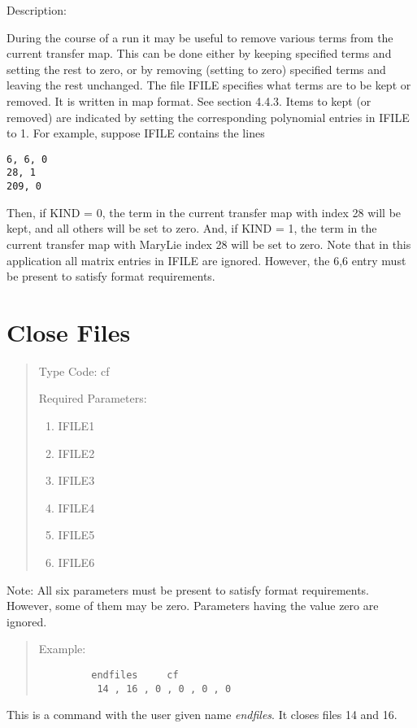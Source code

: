 \vspace{5mm}
     Description:
\vspace{2mm}

During the course of a \Mary run it may be useful to remove various terms from the current transfer map.  This can be done either by keeping specified terms and setting the rest to zero, or by removing (setting to zero) specified terms and leaving the rest unchanged.  The file IFILE specifies what terms are to be kept or removed.  It is written in map format.  See section 4.4.3.  Items to kept (or removed) are indicated by setting the corresponding polynomial entries in IFILE to 1.  For example,  suppose IFILE contains the lines
\begin{verbatim}
6, 6, 0
28, 1
209, 0
\end{verbatim}
Then, if KIND = 0, the term in the current transfer map with \Mary
index 28 will be kept, and all others will be set to zero.  And, if
KIND = 1, the term in the current transfer map with MaryLie index 28 will be set to zero.  Note that in this application all matrix entries
in IFILE are ignored.  However, the 6,6 entry must be present to satisfy format requirements.

\newpage
\section{Close Files}
\begin{quotation}
\noindent Type Code:  cf 
\vspace{5mm}

\noindent Required Parameters:
\begin{enumerate}
      \item  IFILE1
      \item  IFILE2
      \item  IFILE3
      \item  IFILE4
      \item  IFILE5
      \item  IFILE6
\end{enumerate}
\end{quotation}
Note:  All six parameters must be present to satisfy format requirements.
However, some of them may be zero.  Parameters having the value zero are
ignored.
\begin{quotation}
\vspace{5mm}
\noindent Example:
\begin{verbatim}
         endfiles     cf
          14 , 16 , 0 , 0 , 0 , 0
\end{verbatim}
\end{quotation}
This is a command with the user given name {\em endfiles}.  It closes files 14 and 16.

